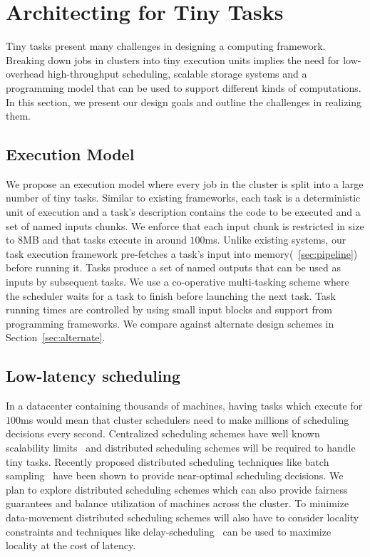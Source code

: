 \section{Architecting for Tiny Tasks}
Tiny tasks present many challenges in designing a computing framework.  Breaking
down jobs in clusters into tiny execution units implies the need for
low-overhead high-throughput scheduling, scalable storage systems and a
programming model that can be used to support different kinds of computations.
In this section, we present our design goals and outline the challenges in
realizing them.

\subsection{Execution Model}
We propose an execution model where every job in the cluster is split into a
large number of tiny tasks. Similar to existing frameworks, each task is a
deterministic unit of execution and a task's description contains the code to be
executed and a set of named inputs chunks. We enforce that each input chunk is
restricted in size to 8MB and that tasks execute in around $100$ms.  Unlike
existing systems, our task execution framework pre-fetches a task's input into
memory(~\ref{sec:pipeline}) before running it. Tasks produce a set of named
outputs that can be used as inputs by subsequent tasks. We use a co-operative
multi-tasking scheme where the scheduler waits for a task to finish before launching
the next task.  Task running times are controlled by using small input blocks
and support from programming frameworks. We compare against alternate design
schemes in Section~\ref{sec:alternate}.

\subsection{Low-latency scheduling}
In a datacenter containing thousands of machines, having tasks which execute for
$100$ms would mean that cluster schedulers need to make millions of scheduling
decisions every second. Centralized scheduling schemes have well known
scalability limits~\cite{john-wilkes-berkeley} and distributed scheduling
schemes will be required to handle tiny tasks. Recently proposed distributed
scheduling techniques like batch sampling~\cite{sparrow} have been shown to 
provide near-optimal scheduling decisions. We plan to explore distributed 
scheduling schemes which can also provide fairness guarantees and balance
utilization of machines across the cluster. To minimize data-movement
distributed scheduling schemes will also have to consider locality constraints
and techniques like delay-scheduling~\cite{delay} can be used to maximize locality at the
cost of latency. 

